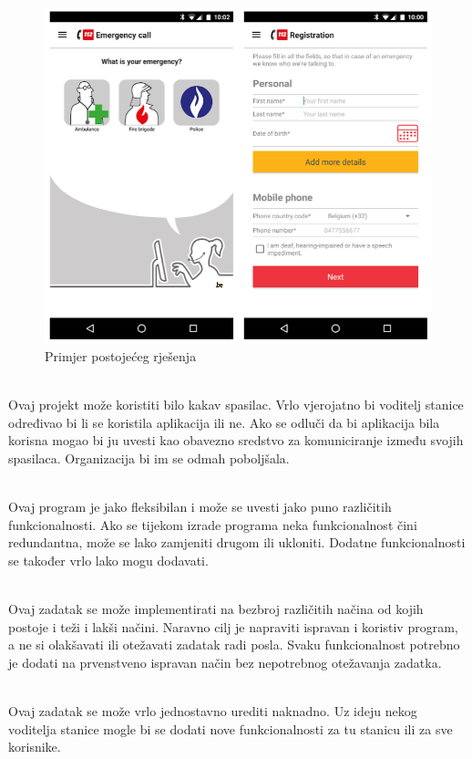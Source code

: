		\begin{figure}[H]
			\includegraphics[scale=0.5]{slike/112-app-options.PNG}
			\centering
			\caption{Primjer postojećeg rješenja}
			\label{fig:112_BE}
			\end{figure}
		
		\textbf{}\\
		\text Ovaj projekt može koristiti bilo kakav spasilac. Vrlo vjerojatno bi voditelj stanice određivao bi li se koristila aplikacija ili ne. Ako se odluči da bi aplikacija bila korisna mogao bi ju uvesti kao obavezno sredstvo za komuniciranje između svojih spasilaca. Organizacija bi im se odmah poboljšala.
		
		\textbf{}\\
		\text Ovaj program je jako fleksibilan i može se uvesti jako puno različitih funkcionalnosti. Ako se tijekom izrade programa neka funkcionalnost čini redundantna, može se lako zamjeniti drugom ili ukloniti. Dodatne funkcionalnosti se također vrlo lako mogu dodavati.
		
		\textbf{}\\
		\text Ovaj zadatak se može implementirati na bezbroj različitih načina od kojih postoje i teži i lakši načini. Naravno cilj je napraviti ispravan i koristiv program, a ne si olakšavati ili otežavati zadatak radi posla. Svaku funkcionalnost potrebno je dodati na prvenstveno ispravan način bez nepotrebnog otežavanja zadatka.
		
		\textbf{}\\
		\text Ovaj zadatak se može vrlo jednostavno urediti naknadno. Uz ideju nekog voditelja stanice mogle bi se dodati nove funkcionalnosti za tu stanicu ili za sve korisnike.
		
		
		\eject
		
		
		
	